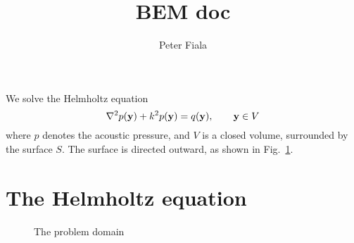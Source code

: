 \documentclass[10pt,onecolumn]{article}
\author{Peter Fiala}
\title{BEM doc}
\begin{document}
\maketitle

We solve the Helmholtz equation
%
\begin{equation}
\nabla^2 p({\bf y}) + k^2 p({\bf y}) = q({\bf y}), \qquad {\bf y} \in V
\end{equation}
%
where $p$ denotes the acoustic pressure, and $V$ is a closed volume, surrounded by the surface $S$. The surface is directed outward, as shown in Fig.~\ref{fig:problemdomain}.

\section{The Helmholtz equation}

\begin{figure}
\caption{The problem domain}
\label{fig:problemdomain}
\end{figure}
\end{document}
